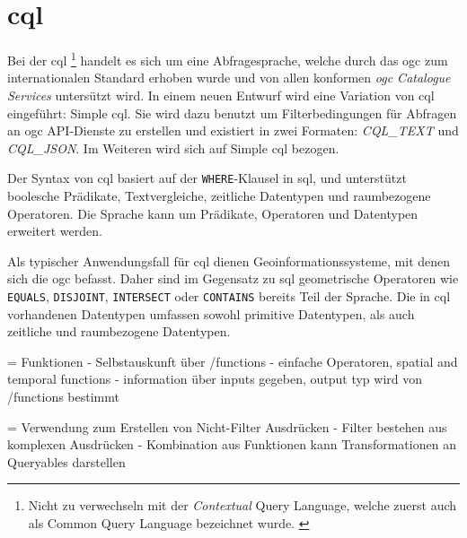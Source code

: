 \section{\acl{cql}}

Bei der \acf{cql} \footnote{Nicht zu verwechseln mit der \textit{Contextual} Query Language, welche
zuerst auch als Common Query Language bezeichnet wurde.
\parencite{thelibraryofcongressCQLContextual2023, ZINGGentle2003}} handelt es sich um eine
Abfragesprache, welche durch das \ac{ogc} zum internationalen Standard erhoben wurde und von allen
konformen \textit{\ac{ogc} Catalogue Services} untersützt wird.  In
einem neuen Entwurf  wird eine Variation von \ac{cql} eingeführt: Simple
\ac{cql}. Sie wird dazu benutzt um Filterbedingungen für Abfragen an \ac{ogc} API-Dienste zu
erstellen und existiert in zwei Formaten: \textit{CQL\_TEXT} und \textit{CQL\_JSON}.  Im
Weiteren wird sich auf Simple \ac{cql} bezogen.

Der Syntax von \ac{cql} basiert auf der \texttt{WHERE}-Klausel in \acs{sql}, und unterstützt
boolesche Prädikate, Textvergleiche, zeitliche Datentypen und raumbezogene Operatoren. Die Sprache
kann um Prädikate, Operatoren und Datentypen erweitert werden.

Als typischer Anwendungsfall für \ac{cql} dienen Geoinformationssysteme, mit denen sich die \ac{ogc}
befasst. Daher sind im Gegensatz zu \ac{sql} geometrische Operatoren wie \texttt{EQUALS},
\texttt{DISJOINT}, \texttt{INTERSECT} oder \texttt{CONTAINS} bereits Teil der Sprache. Die in
\ac{cql} vorhandenen Datentypen umfassen sowohl primitive Datentypen, als auch zeitliche und
raumbezogene Datentypen.

= Funktionen
- Selbstauskunft über /functions
- einfache Operatoren, spatial and temporal functions
- information über inputs gegeben, output typ wird von /functions bestimmt

= Verwendung zum Erstellen von Nicht-Filter Ausdrücken
- Filter bestehen aus komplexen Ausdrücken
- Kombination aus Funktionen kann Transformationen an Queryables darstellen
